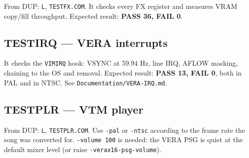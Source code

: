 \documentclass[
]{article}
\newenvironment{Shaded}{}{}
\newcommand{\AttributeTok}[1]{\textcolor[rgb]{0.49,0.56,0.16}{#1}}
\newcommand{\DataTypeTok}[1]{\textcolor[rgb]{0.56,0.13,0.00}{#1}}
\newcommand{\NormalTok}[1]{#1}
\newcommand{\VariableTok}[1]{\textcolor[rgb]{0.10,0.09,0.49}{#1}}
\begin{document}
From DUP: \texttt{L}, \texttt{TESTFX.COM}. It checks every FX register
and measures VRAM copy/fill throughput. Expected result: \textbf{PASS
36, FAIL 0}.

\subsection{TESTIRQ --- VERA interrupts}\label{testirq-vera-interrupts}

\begin{Shaded}
\end{Shaded}

It checks the \texttt{VIMIRQ} hook: VSYNC at 59.94 Hz, line IRQ, AFLOW
masking, chaining to the OS and removal. Expected result: \textbf{PASS
13, FAIL 0}, both in PAL and in NTSC. See
\texttt{Documentation/VERA-IRQ.md}.

\subsection{TESTPLR --- VTM player}\label{testplr-vtm-player}

\begin{Shaded}
\end{Shaded}

From DUP: \texttt{L}, \texttt{TESTPLR.COM}. Use \texttt{-pal} or
\texttt{-ntsc} according to the frame rate the song was converted for.
\texttt{-volume\ 100} is needed: the VERA PSG is quiet at the default
mixer level (or raise \texttt{-verax16-psg-volume}).
\end{document}
